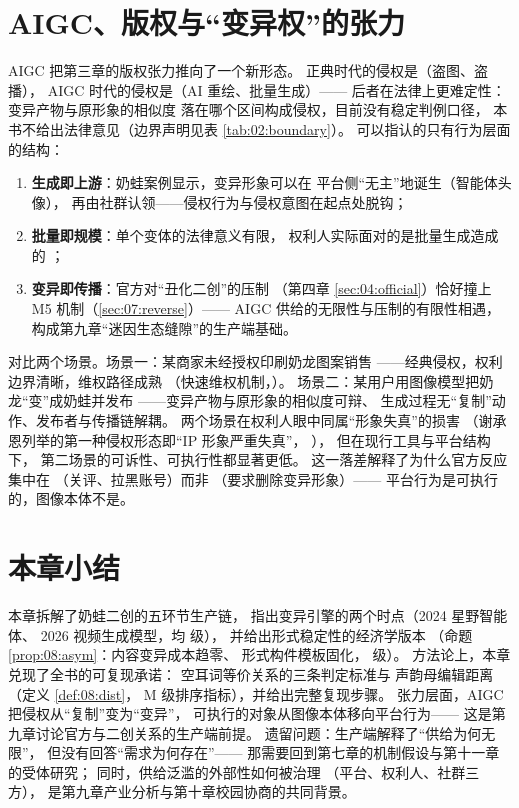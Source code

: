 \section{AIGC、版权与“变异权”的张力}\label{sec:08:copyright}

AIGC 把第三章的版权张力推向了一个新形态。
正典时代的侵权是（盗图、盗播），
AIGC 时代的侵权是（AI 重绘、批量生成）——
后者在法律上更难定性：变异产物与原形象的相似度
落在哪个区间构成侵权，目前没有稳定判例口径，
本书不给出法律意见（边界声明见表 \ref{tab:02:boundary}）。
可以指认的只有行为层面的结构：

\begin{enumerate}[label=\arabic*.]
  \item \textbf{生成即上游}：奶蛙案例显示，变异形象可以在
        平台侧“无主”地诞生（智能体头像），
        再由社群认领——侵权行为与侵权意图在起点处脱钩；
  \item \textbf{批量即规模}：单个变体的法律意义有限，
        权利人实际面对的是批量生成造成的
        ；
  \item \textbf{变异即传播}：官方对“丑化二创”的压制
        （第四章 \ref{sec:04:official}）恰好撞上
        M5 机制（\ref{sec:07:reverse}）——
        AIGC 供给的无限性与压制的有限性相遇，
        构成第九章“迷因生态缝隙”的生产端基础。
\end{enumerate}

\begin{nlcase}[案例 8-1：从“变形”到“变异”的权利视角]
  对比两个场景。场景一：某商家未经授权印刷奶龙图案销售
  ——经典侵权，权利边界清晰，维权路径成熟
  （快速维权机制，\cite{jiang2026nailong}）。
  场景二：某用户用图像模型把奶龙“变”成奶蛙并发布
  ——变异产物与原形象的相似度可辩、
  生成过程无“复制”动作、发布者与传播链解耦。
  两个场景在权利人眼中同属“形象失真”的损害
  （谢承恩列举的第一种侵权形态即“IP 形象严重失真”，
  \cite{jiang2026nailong}），
  但在现行工具与平台结构下，
  第二场景的可诉性、可执行性都显著更低。
  这一落差解释了为什么官方反应集中在
  （关评、拉黑账号）而非
  （要求删除变异形象）——
  平台行为是可执行的，图像本体不是。
\end{nlcase}

\section{本章小结}\label{sec:08:summary}

本章拆解了奶蛙二创的五环节生产链，
指出变异引擎的两个时点（2024 星野智能体、
2026 视频生成模型，均  级），
并给出形式稳定性的经济学版本
（命题 \ref{prop:08:asym}：内容变异成本趋零、
形式构件模板固化， 级）。
方法论上，本章兑现了全书的可复现承诺：
空耳词等价关系的三条判定标准与
声韵母编辑距离（定义 \ref{def:08:dist}，
M 级排序指标），并给出完整复现步骤。
张力层面，AIGC 把侵权从“复制”变为“变异”，
可执行的对象从图像本体移向平台行为——
这是第九章讨论官方与二创关系的生产端前提。
遗留问题：生产端解释了“供给为何无限”，
但没有回答“需求为何存在”——
那需要回到第七章的机制假设与第十一章的受体研究；
同时，供给泛滥的外部性如何被治理
（平台、权利人、社群三方），
是第九章产业分析与第十章校园协商的共同背景。

